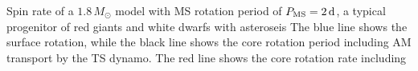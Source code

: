  \label{fig:MRI1.8rot} Spin rate of a $1.8 \, M_\odot$ model with MS rotation period of $P_{\rm MS} = 2 \, {\rm d}$, a typical progenitor of red giants and white dwarfs with asteroseis The blue line shows the surface rotation, while the black line shows the core rotation period including AM transport by the TS dynamo. The red line shows the core rotation rate including
